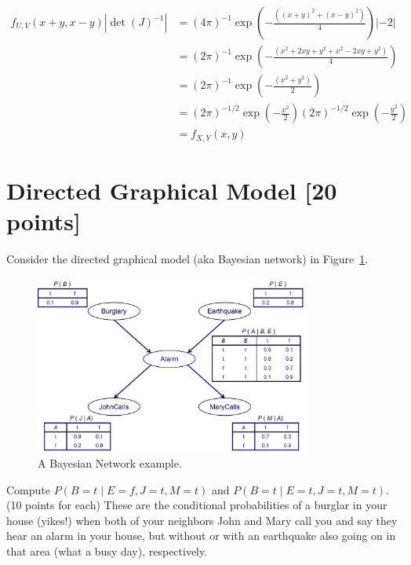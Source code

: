 \documentclass[a4paper]{article}
\theoremstyle{definition}
\newenvironment{soln}{
	\leavevmode\color{blue}\ignorespaces
}{}
\begin{document}
\begin{enumerate}[label=(\alph*)]
		\begin{soln}
			$$ \begin{aligned}
				f_{U,V}(x+y, x-y)|\det(J)^{-1}| & = (4\pi)^{-1}\exp\left(-\frac{((x+y)^2+(x-y)^2)}{4}\right) |-2| \\
				& = (2\pi)^{-1}\exp\left(-\frac{(x^2+2xy+y^2+x^2-2xy+y^2)}{4}\right) \\
				& = (2\pi)^{-1}\exp\left(-\frac{(x^2+y^2)}{2}\right) \\
				& = (2\pi)^{-1/2}\exp\left(-\frac{x^2}{2}\right) (2\pi)^{-1/2}\exp\left(-\frac{y^2}{2}\right) \\
				& = f_{X,Y}(x, y)
			\end{aligned} $$
		\end{soln}
	\end{enumerate}

\section{Directed Graphical Model [20 points]}
Consider the directed graphical model (aka Bayesian network) in Figure~\ref{fig:bn}.
\begin{figure}[H]
    \centering
    \includegraphics[width=0.8\textwidth]{BN.jpg}
    \caption{A Bayesian Network example.}
    \label{fig:bn}
\end{figure}
Compute $P(B=t \mid E=f,J=t,M=t)$ and $P(B=t \mid E=t,J=t,M=t)$. (10 points for each) These are the conditional probabilities of a burglar in your house (yikes!) when both of your neighbors John and Mary call you and say they hear an alarm in your house, but without or with an earthquake also going on in that area (what a busy day), respectively.
\end{document}
